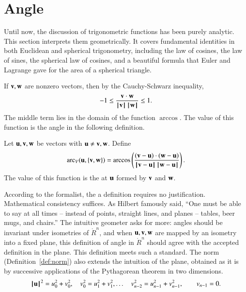 \section{Angle}\label{sec:angle}

Until now, the discussion of trigonometric functions has been purely
analytic.  This section interprets them geometrically.  It covers
fundamental identities in both Euclidean and spherical trigonometry,
including the law of cosines, the law of sines, the spherical law of
cosines, and a beautiful formula that Euler and Lagrange gave for the area of a spherical triangle.

If ${\mathbf v},{\mathbf w}$ are nonzero vectors, then by the
Cauchy-Schwarz inequality,
\[ -1 \le \frac{{\mathbf v}\cdot {\mathbf w}}{{{\hskip0.1em|\hskip-0.15em|\hskip0.1em}{\mathbf v}{\hskip0.1em|\hskip-0.15em|\hskip0.1em}}\,{{\hskip0.1em|\hskip-0.15em|\hskip0.1em}{\mathbf w}{\hskip0.1em|\hskip-0.15em|\hskip0.1em}}}
  \le 1.\]  The middle term  lies in the
domain of the function $\arccos$. The value of this function is the angle in  the following
definition.  %
%
%

\begin{definition}\label{def:angle}
Let ${\mathbf u},{\mathbf v},{\mathbf w}$ be vectors with ${\mathbf u}\ne {\mathbf v},{\mathbf w}$.
Define 
\[ 
  \arc_V(\u,\{\v,\w\}) = \arccos\left(\frac{(\v-\u)\cdot 
(\w-\u)}{\norm{\v}{\u}\,\norm{\w}{\u}}\right).
\] 
The value of this function is the  at ${\mathbf u}$ formed by
${\mathbf v}$ and ${\mathbf w}$.  %
%
%
%
%
\end{definition}

\figLIKEURF %

\begin{tidbit}
  According to the formalist, the a definition requires no
  justification.  Mathematical consistency suffices.  As Hilbert
  famously said, ``One must be able to say at all times -- instead of
  points, straight lines, and planes -- tables, beer mugs, and
  chairs.''  The intuitive geometer asks for more: angles should be
  invariant under isometries of $\ring{R}^n$, and when ${\mathbf u},{\mathbf v},{\mathbf w}$ are
  mapped by an isometry into a fixed plane, this definition of angle
  in $\ring{R}^n$ should agree with the accepted definition in the
  plane.  This definition meets such a standard.  The norm
  (Definition~\ref{def:norm}) also extends the intuition of the plane,
  obtained as it is by successive applications of the Pythagorean
  theorem in two dimensions.
\[
{{\hskip0.1em|\hskip-0.15em|\hskip0.1em}{\mathbf u}{\hskip0.1em|\hskip-0.15em|\hskip0.1em}}^2 = u_0^2 + v_0^2,\quad v_0^2 = u_1^2 + v_1^2,\ldots
\quad v_{n-2}^2 = u_{n-1}^2 + v_{n-1}^2,\qquad v_{n-1}=0.
\]
\end{tidbit}

